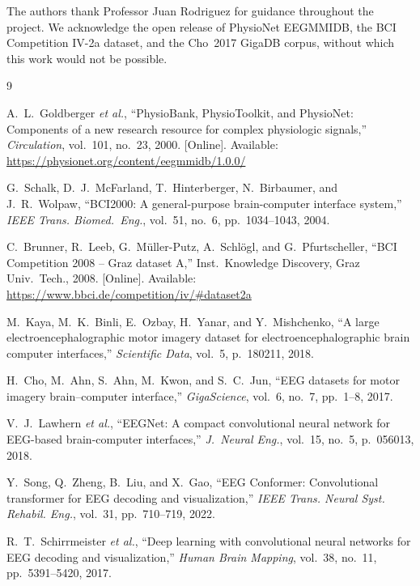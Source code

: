 \documentclass[conference]{IEEEtran}
\begin{document}
The authors thank Professor Juan Rodriguez for guidance throughout the project. We acknowledge the open release of PhysioNet EEGMMIDB, the BCI Competition IV-2a dataset, and
the Cho~2017 GigaDB corpus, without which this work would not be
possible.

\begin{thebibliography}{9}

A.~L.~Goldberger \emph{et al.},
``PhysioBank, PhysioToolkit, and PhysioNet: Components of a new research
resource for complex physiologic signals,''
\emph{Circulation}, vol.~101, no.~23, 2000.
[Online]. Available: \url{https://physionet.org/content/eegmmidb/1.0.0/}

G.~Schalk, D.~J.~McFarland, T.~Hinterberger, N.~Birbaumer, and
J.~R.~Wolpaw,
``BCI2000: A general-purpose brain-computer interface system,''
\emph{IEEE Trans. Biomed.\ Eng.}, vol.~51, no.~6, pp.~1034--1043, 2004.

C.~Brunner, R.~Leeb, G.~M\"uller-Putz, A.~Schl\"ogl, and G.~Pfurtscheller,
``BCI Competition 2008 -- Graz dataset A,''
Inst.\ Knowledge Discovery, Graz Univ.\ Tech., 2008.
[Online]. Available: \url{https://www.bbci.de/competition/iv/#dataset2a}

M.~Kaya, M.~K.~Binli, E.~Ozbay, H.~Yanar, and Y.~Mishchenko,
``A large electroencephalographic motor imagery dataset for
electroencephalographic brain computer interfaces,''
\emph{Scientific Data}, vol.~5, p.~180211, 2018.

H.~Cho, M.~Ahn, S.~Ahn, M.~Kwon, and S.~C.~Jun,
``EEG datasets for motor imagery brain--computer interface,''
\emph{GigaScience}, vol.~6, no.~7, pp.~1--8, 2017.

V.~J.~Lawhern \emph{et al.},
``EEGNet: A compact convolutional neural network for EEG-based
brain-computer interfaces,''
\emph{J.\ Neural Eng.}, vol.~15, no.~5, p.~056013, 2018.

Y.~Song, Q.~Zheng, B.~Liu, and X.~Gao,
``EEG Conformer: Convolutional transformer for EEG decoding and
visualization,''
\emph{IEEE Trans. Neural Syst. Rehabil. Eng.}, vol.~31, pp.~710--719,
2022.

R.~T.~Schirrmeister \emph{et al.},
``Deep learning with convolutional neural networks for EEG decoding and
visualization,''
\emph{Human Brain Mapping}, vol.~38, no.~11, pp.~5391--5420, 2017.


\end{thebibliography}
\end{document}
